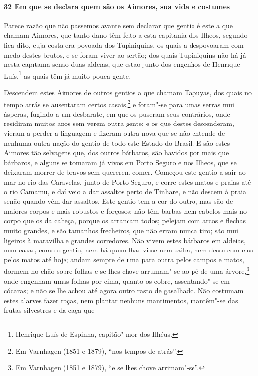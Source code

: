 \paragraph{32 Em que se declara quem são os Aimores, sua vida e costumes}

Parece razão que não passemos avante sem declarar que gentio é este a que chamam Aimores,
que tanto dano têm feito a esta capitania dos Ilheos, segundo fica dito, cuja costa era
povoada dos Tupiniquins, os quais a despovoaram com medo destes brutos, e se foram viver
ao sertão; dos quais Tupiniquins não há já nesta capitania senão duas aldeias, que estão
junto dos engenhos de Henrique Luís,\footnote{ Henrique Luís de Espinha, capitão"-mor dos
Ilhéus.} as quais têm já muito pouca gente.

Descendem estes Aimores de outros gentios a que chamam Tapuyas, dos quais no tempo atrás
se ausentaram certos casais,\footnote{ Em Varnhagen (1851 e 1879), ``nos tempos de
atrás''.} e foram"-se para umas serras mui ásperas, fugindo a um desbarate, em que os
puseram seus contrários, onde residiram muitos anos sem verem outra gente; e os que destes
descenderam, vieram a perder a linguagem e fizeram outra nova que se não entende de
nenhuma outra nação do gentio de todo este Estado do Brasil. E são estes Aimores tão
selvagens que, dos outros bárbaros, são havidos por mais que bárbaros, e alguns se tomaram
já vivos em Porto Seguro e nos Ilheos, que se deixaram morrer de bravos sem quererem
comer. Começou este gentio a sair ao mar no rio das Caravelas, junto de Porto Seguro, e
corre estes matos e praias até o rio Camamu, e daí veio a dar assaltos perto de Tinhare, e
não descem à praia senão quando vêm dar assaltos. Este gentio tem a cor do outro, mas são
de maiores corpos e mais robustos e forçosos; não têm barbas nem cabelos mais no corpo que
os da cabeça, porque os arrancam todos; pelejam com arcos e flechas muito grandes, e são
tamanhos frecheiros, que não erram nunca tiro; são mui ligeiros à maravilha e grandes
corredores. Não vivem estes bárbaros em aldeias, nem casas, como o gentio, nem há quem
lhas visse nem saiba, nem desse com elas pelos matos até hoje; andam sempre de uma para
outra pelos campos e matos, dormem no chão sobre folhas e se lhes chove arrumam"-se ao pé
de uma árvore,\footnote{ Em Varnhagen (1851 e 1879), ``e se lhes chove arrimam"-se''.} onde
engenham umas folhas por cima, quanto os cobre, assentando"-se em cócaras; e não se lhe
achou até agora outro rasto de gasalhado. Não costumam estes alarves fazer roças, nem
plantar nenhuns mantimentos, mantêm"-se das frutas silvestres e da caça que
